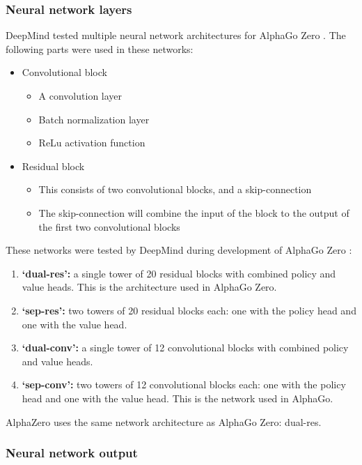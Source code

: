 \documentclass{article}
\begin{document}
\subsubsection{Neural network layers}

DeepMind tested multiple neural network architectures for AlphaGo Zero \cite{NeuralNetworksChessprogramming}. 
The following parts were used in these networks:

\begin{itemize}
    \item Convolutional block
    \begin{itemize}
        \item A convolution layer
        \item Batch normalization layer
        \item ReLu activation function
    \end{itemize}
    \item Residual block
    \begin{itemize}
        \item This consists of two convolutional blocks, and a skip-connection
        \item The skip-connection will combine the input of the block to the output of the first two convolutional blocks
    \end{itemize}
\end{itemize}

These networks were tested by DeepMind during development of AlphaGo Zero \cite{MasteringGameZero}:

\begin{enumerate}
    \item \textbf{`dual-res':} a single tower of 20 residual blocks with combined policy and value heads. This is the architecture used in AlphaGo Zero.
    \item \textbf{`sep-res':} two towers of 20 residual blocks each: one with the policy head and one with the value head.
    \item \textbf{`dual-conv':} a single tower of 12 convolutional blocks with combined policy and value heads.
    \item \textbf{`sep-conv':} two towers of 12 convolutional blocks each: one with the policy head and one with the value head. This is the network used in AlphaGo.
\end{enumerate}

AlphaZero uses the same network architecture as AlphaGo Zero: dual-res.

\subsubsection{Neural network output}
\end{document}
